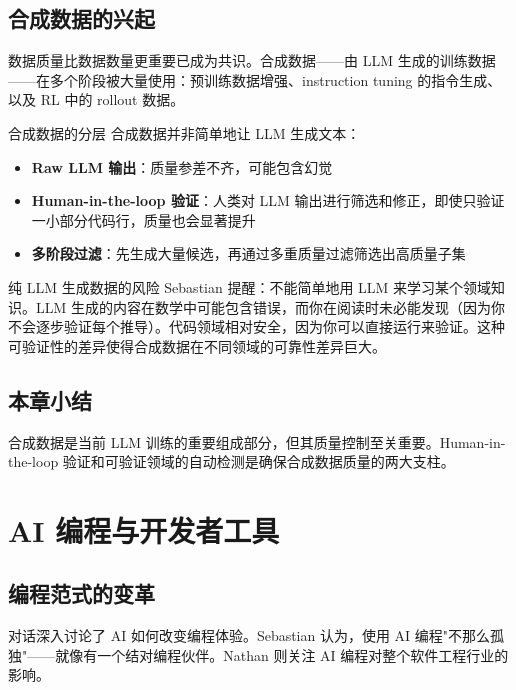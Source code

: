 \documentclass[a4paper]{article}
\begin{document}
\subsection{合成数据的兴起}

数据质量比数据数量更重要已成为共识。合成数据——由 LLM 生成的训练数据——在多个阶段被大量使用：预训练数据增强、instruction tuning 的指令生成、以及 RL 中的 rollout 数据。

\begin{importantbox}{合成数据的分层}
合成数据并非简单地让 LLM 生成文本：
\begin{itemize}
    \item \textbf{Raw LLM 输出}：质量参差不齐，可能包含幻觉
    \item \textbf{Human-in-the-loop 验证}：人类对 LLM 输出进行筛选和修正，即使只验证一小部分代码行，质量也会显著提升
    \item \textbf{多阶段过滤}：先生成大量候选，再通过多重质量过滤筛选出高质量子集
\end{itemize}
\end{importantbox}

\begin{warningbox}{纯 LLM 生成数据的风险}
Sebastian 提醒：不能简单地用 LLM 来学习某个领域知识。LLM 生成的内容在数学中可能包含错误，而你在阅读时未必能发现（因为你不会逐步验证每个推导）。代码领域相对安全，因为你可以直接运行来验证。这种可验证性的差异使得合成数据在不同领域的可靠性差异巨大。
\end{warningbox}

\subsection{本章小结}

合成数据是当前 LLM 训练的重要组成部分，但其质量控制至关重要。Human-in-the-loop 验证和可验证领域的自动检测是确保合成数据质量的两大支柱。

\section{AI 编程与开发者工具}

\subsection{编程范式的变革}

对话深入讨论了 AI 如何改变编程体验。Sebastian 认为，使用 AI 编程"不那么孤独"——就像有一个结对编程伙伴。Nathan 则关注 AI 编程对整个软件工程行业的影响。
\end{document}
